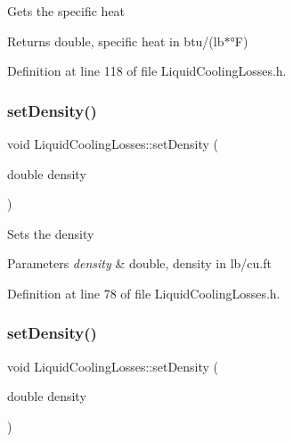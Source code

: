 Gets the specific heat \begin{DoxyReturn}{Returns}
double, specific heat in btu/(lb$\ast$°F) 
\end{DoxyReturn}


Definition at line 118 of file Liquid\+Cooling\+Losses.\+h.

\mbox{\label{class_liquid_cooling_losses_a1fcb1780b588e0a6e5ca052ce2b360dc}} 
\subsubsection{\texorpdfstring{set\+Density()}{setDensity()}\hspace{0.1cm}{\footnotesize\ttfamily [1/3]}}
{\footnotesize\ttfamily void Liquid\+Cooling\+Losses\+::set\+Density (\begin{DoxyParamCaption}\item[{double}]{density }\end{DoxyParamCaption})\hspace{0.3cm}{\ttfamily [inline]}}

Sets the density 
\begin{DoxyParams}{Parameters}
{\em density} & double, density in lb/cu.\+ft \\
\hline
\end{DoxyParams}


Definition at line 78 of file Liquid\+Cooling\+Losses.\+h.

\mbox{\label{class_liquid_cooling_losses_a1fcb1780b588e0a6e5ca052ce2b360dc}} 
\subsubsection{\texorpdfstring{set\+Density()}{setDensity()}\hspace{0.1cm}{\footnotesize\ttfamily [2/3]}}
{\footnotesize\ttfamily void Liquid\+Cooling\+Losses\+::set\+Density (\begin{DoxyParamCaption}\item[{double}]{density }\end{DoxyParamCaption})\hspace{0.3cm}{\ttfamily [inline]}}

